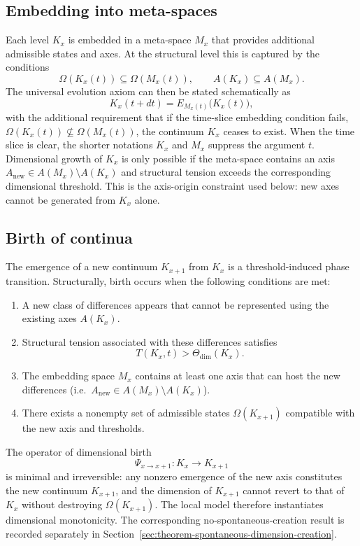 \subsection{Embedding into meta-spaces}

Each level \(K_x\) is embedded in a meta-space \(M_x\) that provides additional admissible states and axes.
At the structural level this is captured by the conditions
\[
    \Omega(K_x(t)) \subseteq \Omega(M_x(t)), \qquad
    A(K_x) \subseteq A(M_x).
\]
The universal evolution axiom can then be stated schematically as
\[
    K_x(t+dt) = E_{M_x(t)}\big(K_x(t)\big),
\]
with the additional requirement that if the time-slice embedding condition
fails, \(\Omega(K_x(t))\not\subseteq\Omega(M_x(t))\), the continuum \(K_x\)
ceases to exist. When the time slice is clear, the shorter notations \(K_x\)
and \(M_x\) suppress the argument \(t\).
Dimensional growth of \(K_x\) is only possible if the meta-space contains an
axis \(A_{\mathrm{new}}\in A(M_x)\setminus A(K_x)\) and structural tension
exceeds the corresponding dimensional threshold. This is the axis-origin
constraint used below: new axes cannot be generated from \(K_x\) alone.

\subsection{Birth of continua}

The emergence of a new continuum \(K_{x+1}\) from \(K_x\) is a threshold-induced phase transition.
Structurally, birth occurs when the following conditions are met:

\begin{enumerate}
    \item A new class of differences appears that cannot be represented using the existing axes \(A(K_x)\).
    \item Structural tension associated with these differences satisfies
          \[
              T(K_x,t) > \Theta_{\mathrm{dim}}(K_x).
          \]
    \item The embedding space \(M_x\) contains at least one axis that can host the new differences (i.e.\ \(A_{\mathrm{new}} \in A(M_x) \setminus A(K_x)\)).
    \item There exists a nonempty set of admissible states \(\Omega(K_{x+1})\) compatible with the new axis and thresholds.
\end{enumerate}

The operator of dimensional birth
\[
    \Psi_{x\to x+1}: K_x \to K_{x+1}
\]
is minimal and irreversible: any nonzero emergence of the new axis constitutes the new continuum \(K_{x+1}\), and the dimension of \(K_{x+1}\) cannot revert to that of \(K_x\) without destroying \(\Omega(K_{x+1})\).
The local model therefore instantiates dimensional monotonicity. The
corresponding no-spontaneous-creation result is recorded separately in
Section~\ref{sec:theorem-spontaneous-dimension-creation}.

